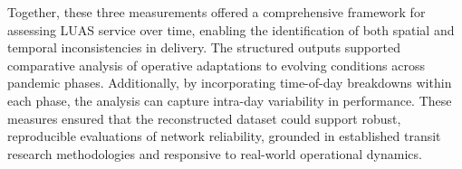     Together, these three measurements offered a comprehensive framework for assessing LUAS service over time, enabling the identification of both spatial and temporal inconsistencies in delivery. The structured outputs supported comparative analysis of operative adaptations to evolving conditions across pandemic phases. Additionally, by incorporating time-of-day breakdowns within each phase, the analysis can capture intra-day variability in performance. These measures ensured that the reconstructed dataset could support robust, reproducible evaluations of network reliability, grounded in established transit research methodologies and responsive to real-world operational dynamics.

